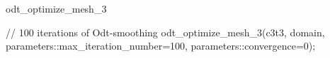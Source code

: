 \begin{ccRefFunction}{odt_optimize_mesh_3}
\ccExample 

\begin{ccExampleCode}
// 100 iterations of Odt-smoothing
odt_optimize_mesh_3(c3t3, domain, parameters::max_iteration_number=100, 
                    parameters::convergence=0);
\end{ccExampleCode}

\ccSeeAlso

 \\
 \\
 \\
 \\
 \\

\end{ccRefFunction}

\ccRefPageEnd

